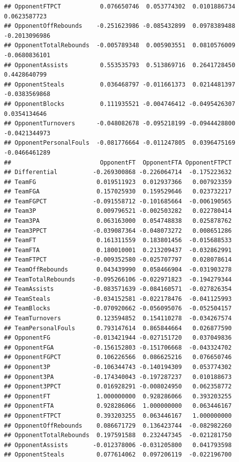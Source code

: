 \documentclass[]{book}
\begin{document}
\begin{verbatim}
## OpponentFTPCT           0.076650746  0.053774302  0.0101886734  0.0623587723
## OpponentOffRebounds    -0.251623986 -0.085432899  0.0978389488 -0.2013096986
## OpponentTotalRebounds  -0.005789348  0.005903551  0.0810576009 -0.0680836101
## OpponentAssists         0.553535793  0.513869716  0.2641728450  0.4428640799
## OpponentSteals          0.036468797 -0.011661373  0.0214481397 -0.0383569868
## OpponentBlocks          0.111935521 -0.004746412 -0.0495426307  0.0354134646
## OpponentTurnovers      -0.048082678 -0.095218199 -0.0944428800 -0.0421344973
## OpponentPersonalFouls  -0.081776664 -0.011247805  0.0396475169 -0.0466461289
##                         OpponentFT  OpponentFTA OpponentFTPCT
## Differential          -0.269300868 -0.226064714  -0.175223632
## TeamFG                 0.019511923  0.012937366   0.007923359
## TeamFGA                0.157025930  0.159529646   0.023732217
## TeamFGPCT             -0.091558712 -0.101685664  -0.006190565
## Team3P                 0.009796521 -0.002503282   0.022780414
## Team3PA                0.063163000  0.054748838   0.025878762
## Team3PPCT             -0.039087364 -0.048073272   0.008651286
## TeamFT                 0.161311559  0.183801456  -0.015688533
## TeamFTA                0.180010001  0.213209437  -0.032862991
## TeamFTPCT             -0.009352580 -0.025707797   0.028078614
## TeamOffRebounds        0.043439990  0.058466904  -0.031903278
## TeamTotalRebounds     -0.095266106 -0.022971823  -0.194279344
## TeamAssists           -0.083571639 -0.084160571  -0.027826354
## TeamSteals            -0.034152581 -0.022178476  -0.041125993
## TeamBlocks            -0.070920662 -0.056095076  -0.052504157
## TeamTurnovers          0.123594852  0.154110278  -0.034267574
## TeamPersonalFouls      0.793147614  0.865844664   0.026877590
## OpponentFG            -0.013421944 -0.027151720   0.037049836
## OpponentFGA           -0.156152803 -0.151706668  -0.043324702
## OpponentFGPCT          0.106226566  0.086625216   0.076650746
## Opponent3P            -0.106344743 -0.140194309   0.053774302
## Opponent3PA           -0.174340043 -0.197287237   0.010188673
## Opponent3PPCT          0.016928291 -0.008024950   0.062358772
## OpponentFT             1.000000000  0.928286066   0.393203255
## OpponentFTA            0.928286066  1.000000000   0.063446167
## OpponentFTPCT          0.393203255  0.063446167   1.000000000
## OpponentOffRebounds    0.086671729  0.136423744  -0.082982260
## OpponentTotalRebounds  0.197591588  0.232447345  -0.021281750
## OpponentAssists       -0.012378006 -0.031205800   0.041793598
## OpponentSteals         0.077614062  0.097206119  -0.022196700

\end{verbatim}
\end{document}

